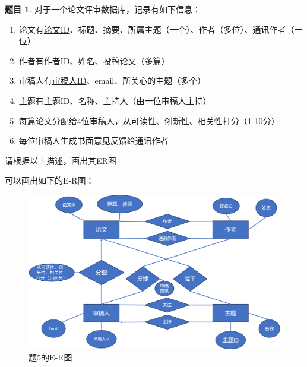 \documentclass[12pt]{article} %
\makeatletter
\theoremstyle{definition}
\newtheorem{problem}{题目}
\newenvironment{proof}[1][\protect\proofname]{\par
\normalfont\topsep6\p@\@plus6\p@\relax
\trivlist
\itemindent\parindent
\item[\hskip\labelsep
\scshape
#1]\ignorespaces
}{%
\endtrivlist\@endpefalse
}
\renewcommand{\proofname}{\it{解答}}
\makeatother
\begin{document}
\begin{problem}
对于一个论文评审数据库，记录有如下信息：
\begin{enumerate}
  \item[\ding{172}] 论文有\uline{论文ID}、标题、摘要、所属主题（一个）、作者（多位）、通讯作者（一位）
  \item[\ding{173}] 作者有\uline{作者ID}、姓名、投稿论文（多篇）
  \item[\ding{174}] 审稿人有\uline{审稿人ID}、email、所关心的主题（多个）
  \item[\ding{175}] 主题有\uline{主题ID}、名称、主持人（由一位审稿人主持）
  \item[\ding{176}] 每篇论文分配给4位审稿人，从可读性、创新性、相关性打分（1-10分）
  \item[\ding{177}] 每位审稿人生成书面意见反馈给通讯作者
\end{enumerate}
请根据以上描述，画出其ER图
\end{problem}

\begin{proof}
可以画出如下的E-R图：
\begin{figure}[H]
  \centering
  \includegraphics[width=1\textwidth]{./figs/5.png}
  \caption{题5的E-R图}
\end{figure}
\end{proof}
\end{document}
